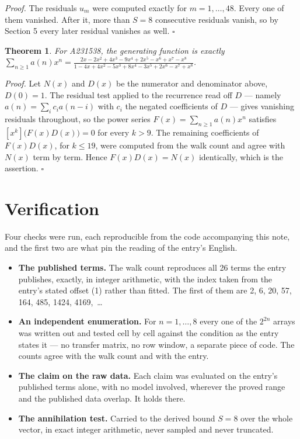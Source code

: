 \documentclass[11pt]{article}
\newtheorem{theorem}{Theorem}
\theoremstyle{definition}
\begin{document}
{\itshape Proof.} The residuals $u_m$ were computed exactly for $m = 1,\dots,48$. Every one of them vanished. After it, more than $S = 8$ consecutive residuals vanish, so by Section 5 every later residual vanishes as well. $\square$

\begin{theorem} For A231538, the generating function is exactly $\sum_{n\ge 1} a(n)x^n = \frac{2x - 2x^{2} + 4x^{3} - 9x^{4} + 2x^{5} - x^{6} + x^{7} - x^{8}}{1 - 4x + 4x^{2} - 5x^{3} + 8x^{4} - 3x^{5} + 2x^{6} - x^{7} + x^{8}}$.\end{theorem}

{\itshape Proof.} Let $N(x)$ and $D(x)$ be the numerator and denominator above, $D(0)=1$. The residual test applied to the recurrence read off $D$ --- namely $a(n) = \sum_i c_i a(n-i)$ with $c_i$ the negated coefficients of $D$ --- gives vanishing residuals throughout, so the power series $F(x)=\sum_{n\ge 1}a(n)x^n$ satisfies $[x^k]\bigl(F(x)D(x)\bigr) = 0$ for every $k > 9$. The remaining coefficients of $F(x)D(x)$, for $k \le 19$, were computed from the walk count and agree with $N(x)$ term by term. Hence $F(x)D(x) = N(x)$ identically, which is the assertion. $\square$

\section{Verification}

Four checks were run, each reproducible from the code accompanying this note, and the first two are what pin the reading of the entry's English.

\begin{itemize}

\item {\bfseries The published terms.} The walk count reproduces all 26 terms the entry publishes, exactly, in integer arithmetic, with the index taken from the entry's stated offset (1) rather than fitted. The first of them are 2, 6, 20, 57, 164, 485, 1424, 4169,~\dots

\item {\bfseries An independent enumeration.} For $n = 1,\dots,8$ every one of the $2^{2n}$ arrays was written out and tested cell by cell against the condition as the entry states it --- no transfer matrix, no row window, a separate piece of code. The counts agree with the walk count and with the entry.

\item {\bfseries The claim on the raw data.} Each claim was evaluated on the entry's published terms alone, with no model involved, wherever the proved range and the published data overlap. It holds there.

\item {\bfseries The annihilation test.} Carried to the derived bound $S = 8$ over the whole vector, in exact integer arithmetic, never sampled and never truncated.

\end{itemize}
\end{document}
